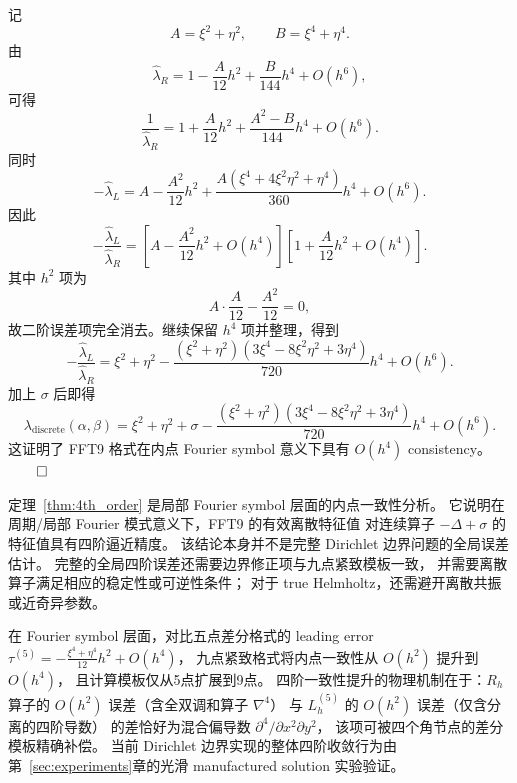 \begin{theorem}
  记
  \[
    A=\xi^2+\eta^2,\qquad B=\xi^4+\eta^4.
  \]
  由
  \[
    \hat{\lambda}_R
    =
    1-\frac{A}{12}h^2+\frac{B}{144}h^4+O(h^6),
  \]
  可得
  \[
    \frac{1}{\hat{\lambda}_R}
    =
    1+\frac{A}{12}h^2+\frac{A^2-B}{144}h^4+O(h^6).
  \]
  同时
  \[
    -\hat{\lambda}_L
    =
    A-\frac{A^2}{12}h^2
    +
    \frac{A(\xi^4+4\xi^2\eta^2+\eta^4)}{360}h^4
    +
    O(h^6).
  \]
  因此
  \begin{equation}
    -\frac{\hat{\lambda}_L}{\hat{\lambda}_R}
    =
    \left[
    A-\frac{A^2}{12}h^2+O(h^4)
    \right]
    \left[
    1+\frac{A}{12}h^2+O(h^4)
    \right].
  \end{equation}
  其中 $h^2$ 项为
  \[
    A\cdot\frac{A}{12}-\frac{A^2}{12}=0,
  \]
  故二阶误差项完全消去。继续保留 $h^4$ 项并整理，得到
  \begin{equation}
    -\frac{\hat{\lambda}_L}{\hat{\lambda}_R}
    =
    \xi^2+\eta^2
    -
    \frac{(\xi^2+\eta^2)(3\xi^4-8\xi^2\eta^2+3\eta^4)}{720}h^4
    +
    O(h^6).
  \end{equation}
  加上 $\sigma$ 后即得
  \begin{equation}
    \lambda_{\mathrm{discrete}}(\alpha,\beta)
    =
    \xi^2+\eta^2+\sigma
    -
    \frac{(\xi^2+\eta^2)(3\xi^4-8\xi^2\eta^2+3\eta^4)}{720}h^4
    +
    O(h^6).
  \end{equation}
  这证明了 FFT9 格式在内点 Fourier symbol 意义下具有 $O(h^4)$ consistency。$\qed$
\end{theorem}

\begin{remark}
  定理~\ref{thm:4th_order} 是局部 Fourier symbol 层面的内点一致性分析。
  它说明在周期/局部 Fourier 模式意义下，FFT9 的有效离散特征值
  对连续算子 $-\Delta+\sigma$ 的特征值具有四阶逼近精度。
  该结论本身并不是完整 Dirichlet 边界问题的全局误差估计。
  完整的全局四阶误差还需要边界修正项与九点紧致模板一致，
  并需要离散算子满足相应的稳定性或可逆性条件；
  对于 true Helmholtz，还需避开离散共振或近奇异参数。
\end{remark}

\begin{remark}
  在 Fourier symbol 层面，对比五点差分格式的 leading error
  $\tau^{(5)} = -\frac{\xi^4+\eta^4}{12}h^2 + O(h^4)$，
  九点紧致格式将内点一致性从 $O(h^2)$ 提升到 $O(h^4)$，
  且计算模板仅从5点扩展到9点。
  四阶一致性提升的物理机制在于：$R_h$ 算子的 $O(h^2)$ 误差（含全双调和算子 $\nabla^4$）
  与 $L_h^{(5)}$ 的 $O(h^2)$ 误差（仅含分离的四阶导数）
  的差恰好为混合偏导数 $\partial^4/\partial x^2\partial y^2$，
  该项可被四个角节点的差分模板精确补偿。
  当前 Dirichlet 边界实现的整体四阶收敛行为由第~\ref{sec:experiments}章的光滑 manufactured solution 实验验证。
\end{remark}

